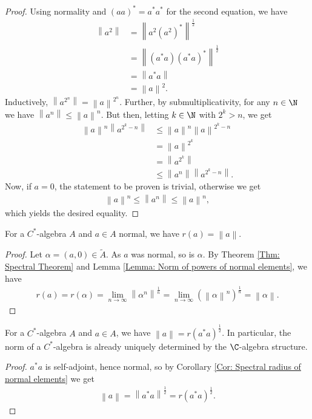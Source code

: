 \documentclass[american]{scrartcl}
\renewcommand{\norm}[1]{\left\lVert #1 \right\rVert}
\begin{document}
\begin{proof}
	Using normality and $(aa)^*=a^*a^*$ for the second equation, we have
	\begin{align*}
		\norm{a^2}&=\norm{a^2\left(a^2\right)^*}^{\frac{1}{2}}\\
		&=\norm{(a^*a)(a^*a)^*}^{\frac{1}{2}}\\
		&=\norm{a^*a}\\
		&=\norm{a}^2.
	\end{align*}
	Inductively, $\norm{a^{2^n}}=\norm{a}^{2^n}$. Further, by submultiplicativity, for any $n\in \N$ we have $\norm{a^n}\leq \norm{a}^n$. But then, letting $k\in \N$ with $2^k>n$, we get
	\begin{align*}
		\norm{a}^n\norm{a^{2^k-n}}&\leq \norm{a}^n\norm{a}^{2^k-n}\\
		&=\norm{a}^{2^k}\\
		&=\norm{a^{2^k}}\\
		&\leq \norm{a^n}\norm{a^{2^k-n}}.
	\end{align*}
	Now, if $a=0$, the statement to be proven is trivial, otherwise we get
	\begin{align*}
		\norm{a}^n\leq \norm{a^n}\leq\norm{a}^n,
	\end{align*}
	which yields the desired equality.
\end{proof}
\begin{corollary}
	For a $C^*$-algebra $A$ and $a\in A$ normal, we have $r(a)=\norm{a}$.
\end{corollary}
\begin{proof}
	Let $\alpha=(a,0)\in \tilde{A}$. As $a$ was normal, so is $\alpha$. By Theorem \ref{Thm: Spectral Theorem} and Lemma \ref{Lemma: Norm of powers of normal elements}, we have
	\begin{align*}
		r(a)=r(\alpha)=\lim_{n\to\infty}\norm{\alpha^n}^{\frac{1}{n}}=\lim_{n\to\infty}\left(\norm{\alpha}^n\right)^{\frac{1}{n}}=\norm{\alpha}.
	\end{align*}
\end{proof}
\begin{corollary}\label{Cor: Spectral radius of normal elements}
	For a $C^*$-algebra $A$ and $a\in A$, we have $\norm{a}=r(a^*a)^{\frac{1}{2}}$. In particular, the norm of a $C^*$-algebra is already uniquely determined by the $\C$-algebra structure.
\end{corollary}
\begin{proof}
	$a^*a$ is self-adjoint, hence normal, so by Corollary \ref{Cor: Spectral radius of normal elements} we get
	\begin{align*}
		\norm{a}=\norm{a^*a}^{\frac{1}{2}}=r(a^*a)^{\frac{1}{2}}.
	\end{align*}
\end{proof}
\end{document}

